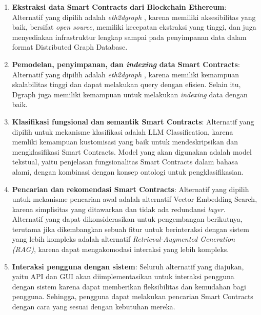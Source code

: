 \begin{enumerate}
	\item \textbf{Ekstraksi data Smart Contracts dari Blockchain Ethereum}: Alternatif yang dipilih adalah \textit{eth2dgraph} \parencite{aimar2023extraction}, karena memiliki aksesibilitas yang baik, bersifat \textit{open source}, memiliki kecepatan ekstraksi yang tinggi, dan juga menyediakan infrastruktur lengkap sampai pada penyimpanan data dalam format Distributed Graph Database.
	\item \textbf{Pemodelan, penyimpanan, dan \textit{indexing} data Smart Contracts}: Alternatif yang dipilih adalah \textit{eth2dgraph} \parencite{aimar2023extraction}, karena memiliki kemampuan skalabilitas tinggi dan dapat melakukan query dengan efisien. Selain itu, Dgraph juga memiliki kemampuan untuk melakukan \textit{indexing} data dengan baik.
	\item \textbf{Klasifikasi fungsional dan semantik Smart Contracts}: Alternatif yang dipilih untuk mekanisme klasifikasi adalah LLM Classification, karena memliki kemampuan kustomisasi yang baik untuk mendeskripsikan dan mengklasifikasi Smart Contracts. Model yang akan digunakan adalah model tekstual, yaitu penjelasan fungsionalitas Smart Contracts dalam bahasa alami, dengan kombinasi dengan konsep ontologi untuk pengklasifikasian.
	\item \textbf{Pencarian dan rekomendasi Smart Contracts}: Alternatif yang dipilih untuk mekanisme pencarian awal adalah alternatif Vector Embedding Search, karena simplisitas yang ditawarkan dan tidak ada redundansi \textit{layer}. Alternatif yang dapat dikonsiderasikan untuk pengembangan berikutnya, terutama jika dikembangkan sebuah fitur untuk berinteraksi dengan sistem yang lebih kompleks adalah alternatif \textit{Retrieval-Augmented Generation (RAG)}, karena dapat mengakomodasi interaksi yang lebih kompleks.
	\item \textbf{Interaksi pengguna dengan sistem}: Seluruh alternatif yang diajukan, yaitu API dan GUI akan diimplementasikan untuk interaksi pengguna dengan sistem karena dapat memberikan fleksibilitas dan kemudahan bagi pengguna. Sehingga, pengguna dapat melakukan pencarian Smart Contracts dengan cara yang sesuai dengan kebutuhan mereka.
\end{enumerate}